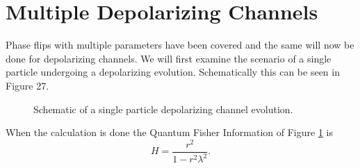 \documentclass[twocolumn]{article}
\begin{document}
\section*{Multiple Depolarizing Channels}
Phase flips with multiple parameters have been covered and the same will now be done for depolarizing channels. We will first examine the scenario of a single particle undergoing a depolarizing evolution. Schematically this can be seen in Figure 27.
\begin{figure}[ht]
    \centering
    \caption{\footnotesize{Schematic of a single particle depolarizing channel evolution.}}
    \label{Fig: SCSPD}
\end{figure}
\par \noindent
When the calculation is done the Quantum Fisher Information of Figure \ref{Fig: SCSPD} is
\begin{equation}\label{Eq: SCSPDQFI}
H=\frac{r^2}{1-r^2\lambda^2}.
\end{equation}
\end{document}
